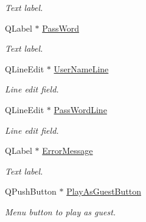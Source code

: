 \begin{DoxyCompactItemize}
\begin{DoxyCompactList}\small\item\em Text label. \end{DoxyCompactList}\item 
\hypertarget{classloginWidget_a091bc8135793361cd5212d770d47d9f6}{Q\-Label $\ast$ \hyperlink{classloginWidget_a091bc8135793361cd5212d770d47d9f6}{Pass\-Word}}\label{classloginWidget_a091bc8135793361cd5212d770d47d9f6}

\begin{DoxyCompactList}\small\item\em Text label. \end{DoxyCompactList}\item 
\hypertarget{classloginWidget_a0063152147c8ffb1def2ee9dc83bfb13}{Q\-Line\-Edit $\ast$ \hyperlink{classloginWidget_a0063152147c8ffb1def2ee9dc83bfb13}{User\-Name\-Line}}\label{classloginWidget_a0063152147c8ffb1def2ee9dc83bfb13}

\begin{DoxyCompactList}\small\item\em Line edit field. \end{DoxyCompactList}\item 
\hypertarget{classloginWidget_a8b2562b3a80b846814e68e4e646fe597}{Q\-Line\-Edit $\ast$ \hyperlink{classloginWidget_a8b2562b3a80b846814e68e4e646fe597}{Pass\-Word\-Line}}\label{classloginWidget_a8b2562b3a80b846814e68e4e646fe597}

\begin{DoxyCompactList}\small\item\em Line edit field. \end{DoxyCompactList}\item 
\hypertarget{classloginWidget_a0a16f61332cb4b47c0869a98fa180fd8}{Q\-Label $\ast$ \hyperlink{classloginWidget_a0a16f61332cb4b47c0869a98fa180fd8}{Error\-Message}}\label{classloginWidget_a0a16f61332cb4b47c0869a98fa180fd8}

\begin{DoxyCompactList}\small\item\em Text label. \end{DoxyCompactList}\item 
\hypertarget{classloginWidget_ad6d4c65a10444007bfb47c7bd87e61cd}{Q\-Push\-Button $\ast$ \hyperlink{classloginWidget_ad6d4c65a10444007bfb47c7bd87e61cd}{Play\-As\-Guest\-Button}}\label{classloginWidget_ad6d4c65a10444007bfb47c7bd87e61cd}

\begin{DoxyCompactList}\small\item\em Menu button to play as guest. \end{DoxyCompactList}\end{DoxyCompactItemize}



